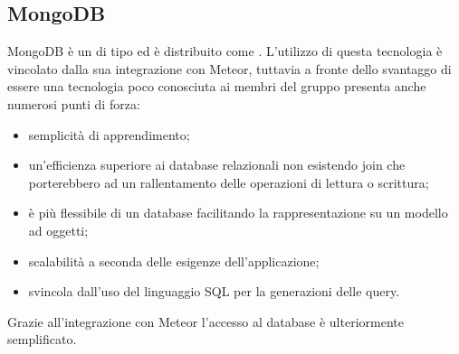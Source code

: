 \subsection{MongoDB}
MongoDB è un    di tipo  ed è distribuito come  . L'utilizzo di questa tecnologia è vincolato dalla sua integrazione con Meteor, tuttavia a fronte dello svantaggo di essere una tecnologia poco conosciuta ai membri del gruppo presenta anche numerosi punti di forza:
\begin{itemize}
	\item semplicità di apprendimento;
	\item un'efficienza superiore ai database relazionali non esistendo join che porterebbero ad un rallentamento delle operazioni di lettura o scrittura; 
	\item è più flessibile di un database  facilitando la rappresentazione su un modello ad oggetti;
	\item scalabilità a seconda delle esigenze dell'applicazione;
	\item svincola dall'uso del linguaggio SQL per la generazioni delle query.
\end{itemize}
Grazie all'integrazione con Meteor l'accesso al database è ulteriormente semplificato.

